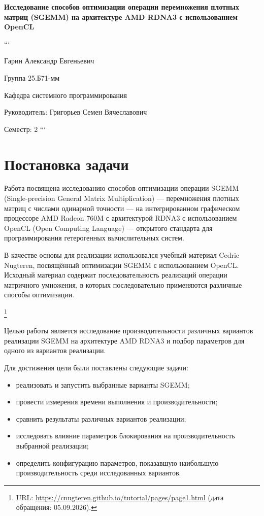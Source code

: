 \documentclass[a4paper]{article}
\begin{document}
\begin{center}
{\Large\bfseries Исследование способов оптимизации операции перемножения плотных матриц (SGEMM) на архитектуре AMD RDNA3 с использованием OpenCL}

```
\vspace{0.5em}

Гарин Александр Евгеньевич

Группа 25.Б71-мм

Кафедра системного программирования

Руководитель: Григорьев Семен Вячеславович

Семестр: 2
```

\end{center}

\section{Постановка задачи}

Работа посвящена исследованию способов оптимизации операции SGEMM (Single-precision General Matrix Multiplication) --- перемножения плотных матриц с числами одинарной точности --- на интегрированном графическом процессоре AMD Radeon 760M с архитектурой RDNA3 с использованием OpenCL (Open Computing Language) --- открытого стандарта для программирования гетерогенных вычислительных систем.

В качестве основы для реализации использовался учебный материал Cedric Nugteren, посвящённый оптимизации SGEMM с использованием OpenCL. Исходный материал содержит последовательность реализаций операции матричного умножения, в которых последовательно применяются различные способы оптимизации.

\footnote{URL: \url{https://cnugteren.github.io/tutorial/pages/page1.html} (дата обращения: 05.09.2026).}

Целью работы является исследование производительности различных вариантов реализации SGEMM на архитектуре AMD RDNA3 и подбор параметров для одного из вариантов реализации.

Для достижения цели были поставлены следующие задачи:
\begin{itemize}
\item реализовать и запустить выбранные варианты SGEMM;
\item провести измерения времени выполнения и производительности;
\item сравнить результаты различных вариантов реализации;
\item исследовать влияние параметров блокирования на производительность выбранной реализации;
\item определить конфигурацию параметров, показавшую наибольшую производительность среди исследованных вариантов.
\end{itemize}
\end{document}

